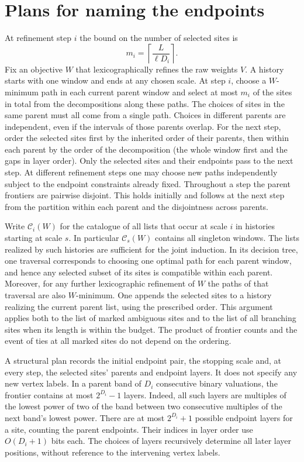 \documentclass[11pt]{article}
\newcommand{\calC}{\mathcal C}
\begin{document}
\section{Plans for naming the endpoints}

At refinement step $i$ the bound on the number of selected sites is
\[
                  m_i=\left\lceil\frac{L}{\ell D_i}\right\rceil .
\]
Fix an objective $W$ that lexicographically refines the raw weights $V$.
A history starts with one window and ends at any chosen scale. At step
$i$, choose a $W$-minimum path in each current parent window and select
at most $m_i$ of the sites in total from the decompositions along these
paths. The choices of sites in the same parent must all come from a
single path. Choices in different parents are independent, even if the
intervals of those parents overlap. For the next step, order the selected
sites first by the inherited order of their parents, then within each
parent by the order of the decomposition (the whole window first and
the gaps in layer order). Only the selected sites and their endpoints pass to the next step. At different refinement steps one may choose
new paths independently subject to the endpoint constraints already fixed.
Throughout a step the parent frontiers are pairwise disjoint. This holds
initially and follows at the next step from the partition within each
parent and the disjointness across parents.

Write $\calC_i(W)$ for the catalogue of all lists that occur at scale
$i$ in histories starting at scale $s$. In particular $\calC_s(W)$
contains all singleton windows. The lists realized by such histories are sufficient for the joint
induction. In its decision tree, one traversal corresponds to choosing
one optimal path for each parent window, and hence any selected subset
of its sites is compatible within each parent. Moreover, for any further
lexicographic refinement of $W$ the paths of that traversal are also
$W$-minimum. One appends the selected sites to a history realizing the
current parent list, using the prescribed order. This argument applies
both to the list of marked ambiguous sites and to the list of all
branching sites when its length is within the budget. The product of
frontier counts and the event of ties at all marked sites do not depend
on the ordering.

A structural plan records the initial endpoint pair, the stopping scale
and, at every step, the selected sites' parents and endpoint layers.
It does not specify any new vertex labels. In a parent band of $D_i$
consecutive binary valuations, the frontier contains at most $2^{D_i}-1$
layers. Indeed, all such layers are multiples of the lowest power of
two of the band between two consecutive multiples of the next band's
lowest power. There are at most $2^{D_i}+1$ possible endpoint layers
for a site, counting the parent endpoints. Their indices in layer order
use $O(D_i+1)$ bits each. The choices of layers recursively determine
all later layer positions, without reference to the intervening vertex
labels.
\end{document}
